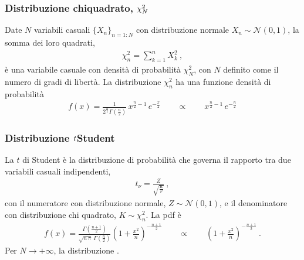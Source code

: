\documentclass[letterpaper,10pt,italian]{jupyterBook}
\begin{document}
\subsubsection{Distribuzione chi\sphinxhyphen{}quadrato, \protect\(\chi^2_N\protect\)}
\label{\detokenize{ch/statistics/pfun_continuous_examples:distribuzione-chi-quadrato-chi-2-n}}\label{\detokenize{ch/statistics/pfun_continuous_examples:statistics-hs-random-variables-continuous-examples-chi2}}
\sphinxAtStartPar
Date \(N\) variabili casuali \(\{ X_n \}_{n=1:N}\) {\hyperref[\detokenize{ch/statistics/iid:statistics-hs-random-variables-iid}]{}} con distribuzione normale \(X_n \sim \mathscr{N}(0,1)\), la somma dei loro quadrati,
\begin{equation*}
\begin{split}\chi_n^2 = \sum_{k=1}^{n} X^2_k \ ,\end{split}
\end{equation*}
\sphinxAtStartPar
è una variabile casuale con densità di probabilità \(\chi^2_N\), con \(N\) definito come il numero di gradi di libertà. La distribuzione \(\chi^2_n\) ha una funzione densità di probabilità
\begin{equation*}
\begin{split}f(x) = \frac{1}{2^{\frac{n}{2}} \Gamma\left(\frac{n}{2}\right)} \, x^{\frac{n}{2}-1} \, e^{-\frac{x}{2}} \qquad \propto \qquad x^{\frac{n}{2}-1} \, e^{-\frac{n}{2}}\end{split}
\end{equation*}

\subsubsection{Distribuzione \protect\(t\protect\)\sphinxhyphen{}Student}
\label{\detokenize{ch/statistics/pfun_continuous_examples:distribuzione-t-student}}\label{\detokenize{ch/statistics/pfun_continuous_examples:statistics-hs-random-variables-continuous-examples-t}}
\sphinxAtStartPar
La \(t\) di Student è la distribuzione di probabilità che governa il rapporto tra due variabili casuali indipendenti,
\begin{equation*}
\begin{split}t_{\nu} = \frac{Z}{\sqrt{\frac{K}{\nu}}} \ ,\end{split}
\end{equation*}
\sphinxAtStartPar
con il numeratore con distribuzione normale, \(Z \sim \mathscr{N}(0,1)\), e il denominatore con distribuzione chi quadrato, \(K \sim \chi^2_n\). La pdf è
\begin{equation*}
\begin{split}f(x) = \frac{\Gamma\left(\frac{n+1}{2}\right)}{\sqrt{n \, \pi} \, \Gamma\left(\frac{n}{2}\right)} \left( 1 + \frac{x^2}{n} \right)^{-\frac{n + 1}{2}} \qquad \propto \qquad \left( 1 + \frac{x^2}{n} \right)^{-\frac{n + 1}{2}} \ .\end{split}
\end{equation*}
\sphinxAtStartPar
{} Per \(N \rightarrow +\infty\), la distribuzione {\hyperref[\detokenize{ch/proofs:proof-t-student-limit-gauss}]{}}.
\end{document}
